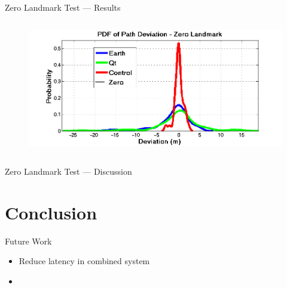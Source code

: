 \documentclass{beamer}
\begin{document}
\begin{frame}{Zero Landmark Test --- Results}
\begin{columns}
\begin{column}{0.5\textwidth}
\begin{figure}
          \end{figure}
          \vspace{-20pt}
          \begin{figure}
            \includegraphics[width=\textwidth]{../graphics/pdf_zero_landmark_deviation.png}
          \end{figure}
        \end{column}
      \end{columns}
    \end{frame}

    \begin{frame}{Zero Landmark Test --- Discussion}
    \end{frame}



\section{Conclusion}

  \begin{frame}{Future Work}
    \begin{itemize}
      \item Reduce latency in combined system
      \item 
    \end{itemize}
  \end{frame}
\end{document}
